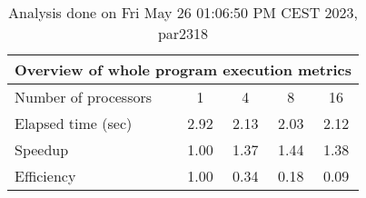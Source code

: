 \begin{table}[h]
\begin{center}
\begin{tabular}{|l|c|c|c|c|}
\hline
\multicolumn{5}{|c|}{Overview of whole program execution metrics} \\
\hline
\hline
Number of processors & 1 & 4 & 8 & 16 \\
\hline
Elapsed time (sec)      &       2.92 &       2.13 &       2.03 &       2.12 \\
\hline
Speedup                 &       1.00 &       1.37 &       1.44 &       1.38 \\
\hline
Efficiency              &       1.00 &       0.34 &       0.18 &       0.09 \\
\hline
\end{tabular}
\end{center}
\caption{ Analysis done on Fri May 26 01:06:50 PM CEST 2023, par2318}
\end{table}
